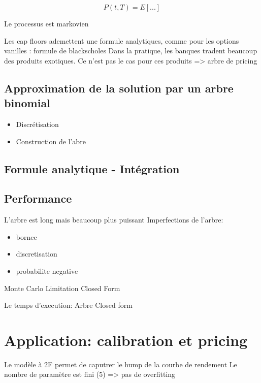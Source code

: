 \documentclass[paper=a4, fontsize=11pt]{scrartcl}
\numberwithin{equation}{section}		%
\numberwithin{figure}{section}			%
\numberwithin{table}{section}				%
\begin{document}
$$P(t, T) = E[...]$$

Le processus est markovien

Les cap floors ademettent une formule analytiques, comme pour les options vanilles : formule de blackscholes
Dans la pratique, les banques tradent beaucoup des produits exotiques. Ce n'est pas le cas pour ces produits => arbre de pricing
\subsection{Approximation de la solution par un arbre binomial}

\begin{itemize}
\item Discrétisation
\item Construction de l'abre
\end{itemize}

\subsection{Formule analytique - Intégration}

\subsection{Performance}
L'arbre est long mais beaucoup plus puissant
Imperfections de l'arbre:
\begin{itemize}
\item  bornee
\item  discretisation
\item  probabilite negative
\end{itemize}
Monte Carlo
Limitation
Closed Form

Le temps d'execution:
Arbre
Closed form

\section{Application: calibration et pricing}
Le modèle à 2F permet de caputrer le hump de la courbe de rendement
Le nombre de paramètre est fini (5) => pas de overfitting
\end{document}
